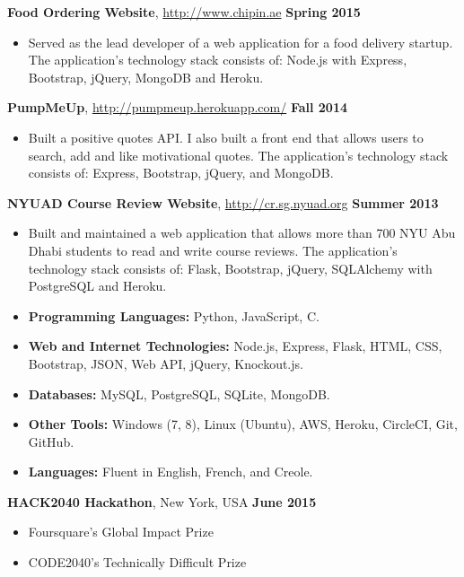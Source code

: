 \documentclass[11pt]{article} %
\begin{document}
\noindent \centerline{\normalsize \textbf{Food Ordering Website}, \url{http://www.chipin.ae} \hfill \textbf{Spring 2015}}
\begin{itemize}
  \item Served as the lead developer of a web application for a food delivery startup. The application's technology stack consists of: Node.js with Express, Bootstrap, jQuery, MongoDB and Heroku.
\end{itemize}
\noindent \centerline{\normalsize \textbf{PumpMeUp}, \url{http://pumpmeup.herokuapp.com/} \hfill \textbf{Fall 2014}}
\begin{itemize}\itemsep-0.2em
  \item Built a positive quotes API. I also built a front end that allows users to search, add and like motivational quotes. The application's technology stack consists of: Express, Bootstrap, jQuery, and MongoDB.
\end{itemize}
\noindent \centerline{\normalsize \textbf{NYUAD Course Review Website}, \url{http://cr.sg.nyuad.org} \hfill \textbf{Summer 2013}}
\begin{itemize}\itemsep-0.2em
  \item Built and maintained a web application that allows more than 700 NYU Abu Dhabi students to read and write course reviews. The application's technology stack consists of: Flask, Bootstrap, jQuery, SQLAlchemy with PostgreSQL and Heroku.
\end{itemize}
\medskip

\begin{itemize}\itemsep-0.2em
  \item \textbf{Programming Languages:} Python, JavaScript, C.
  \item \textbf{Web and Internet Technologies:} Node.js, Express, Flask, HTML, CSS, Bootstrap, JSON, Web API, jQuery, Knockout.js.
  \item \textbf{Databases:} MySQL, PostgreSQL, SQLite, MongoDB.
  \item \textbf{Other Tools:} Windows (7, 8), Linux (Ubuntu), AWS, Heroku, CircleCI, Git, GitHub.
  \item \textbf{Languages:} Fluent in English, French, and Creole.
\end{itemize}
\medskip

 \medskip

\noindent \centerline{\normalsize  \textbf {HACK2040 Hackathon}, New York, USA \hfill \textbf{June 2015}}
\begin{itemize}\itemsep-0.2em
  \item Foursquare's Global Impact Prize
  \item CODE2040's Technically Difficult Prize
\end{itemize}
\end{document}
